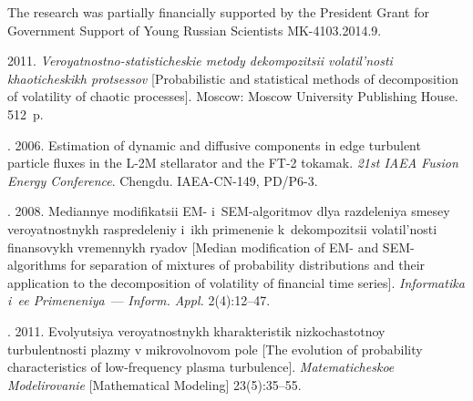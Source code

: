 

\vspace*{-3pt}

\Ack
\noindent
The research was partially financially supported by the President 
Grant for Government Support of Young Russian Scientists 
MK-4103.2014.9.


  \begin{multicols}{2}

\renewcommand{\bibname}{\protect\rmfamily References}



{\small\frenchspacing
 { %
 \begin{thebibliography}{9}
 2011.
\textit{Veroyatnostno-statisticheskie metody dekompozitsii volatil'nosti
khaoticheskikh protsessov} [Probabilistic and statistical methods of decomposition of volatility of
chaotic processes]. Moscow: Moscow University Publishing House. 512~p.

.
 2006. Estimation of
 dynamic and diffusive components in edge turbulent
particle fluxes in the L-2M stellarator and the FT-2 tokamak.
\textit{21st IAEA Fusion Energy
Conference}. Chengdu. IAEA-CN-149, PD/P6-3.

.
2008.   Mediannye
modifikatsii EM- i~SEM-al\-go\-rit\-mov dlya razdeleniya smesey ve\-ro\-yat\-nost\-nykh
raspredeleniy i~ikh primenenie k~dekompozitsii volatil'nosti finansovykh
vremennykh ryadov [Median modification of EM- and SEM-algorithms for
separation of mixtures of probability distributions and their application to
the decomposition of volatility of financial time series].
\textit{Informatika i~ee Primeneniya}~--- \textit{Inform. Appl.} 2(4):12--47.

. 2011.
Evolyutsiya veroyatnostnykh kharakteristik nizkochastotnoy turbulentnosti plazmy v mikrovolnovom pole
[The evolution of probability characteristics of low-frequency plasma turbulence].
\textit{Matematicheskoe Modelirovanie} [Mathematical Modeling]
23(5):35--55.
\end{thebibliography}

 }
 }

\end{multicols}

